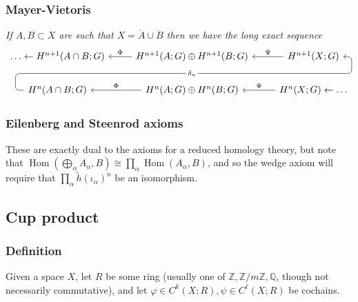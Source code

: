\documentclass[10pt]{article}
\newcommand{\zz}{\mathbb{Z}}
\newcommand{\qq}{\mathbb{Q}}
\newcommand{\interior}[1]{\mathring{#1}}
\newcommand{\reduced}[1]{\widetilde{#1}}
\DeclareMathOperator{\Hom}{Hom}
\begin{document}
            \subsubsection{Mayer-Vietoris}

                \emph{If $A,B\subset X$ are such that $X=\interior{A}\cup\interior{B}$ then we have the long exact sequence}
                \begin{equation*}
                    \begin{tikzcd}
                        \ldots\leftarrow{H}^{n+1}(A\cap B;G)
                        & {H}^{n+1}(A;G)\oplus{H}^{n+1}(B;G) \lar[swap]{\Phi} \ar[draw=none]{d}[name=X, anchor=center]{}
                        & {H}^{n+1}(X;G) \lar[swap]{\Psi}\\
                        {H}^{n}(A\cap B;G) \ar[rounded corners,
                                to path={ -- ([xshift=-2ex]\tikztostart.west)
                                          |- (X.center) \tikztonodes
                                          -| ([xshift=2ex]\tikztotarget.east)
                                          -- (\tikztotarget)}]{urr}[description, at end]{\delta_n}
                        & {H}^{n}(A;G)\oplus{H}^n(B;G) \lar[swap]{\Phi}
                        & {H}^{n}(X;G) \lar[swap]{\Psi} \leftarrow\ldots
                    \end{tikzcd}
                \end{equation*}

            \subsubsection{Eilenberg and Steenrod axioms}

                These are exactly dual to the axioms for a reduced homology theory, but note that $\Hom\left(\bigoplus_\alpha A_\alpha,B\right)\cong\prod_\alpha\Hom(A_\alpha,B)$, and so the wedge axiom will require that $\prod_\alpha \reduced{h}(\iota_\alpha)^n$ be an isomorphism.

        \subsection{Cup product}

            \subsubsection{Definition}

                Given a space $X$, let $R$ be some ring (usually one of $\zz,\zz/m\zz,\qq$, though not necessarily commutative), and let $\varphi\in C^k(X;R),\psi\in C^\ell(X;R)$ be cochains.
\end{document}
